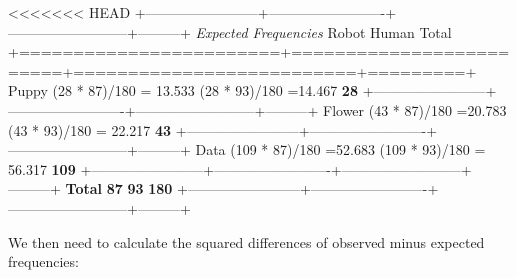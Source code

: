 \documentclass[
]{book}
\begin{document}
\textless\textless\textless\textless\textless\textless\textless{} HEAD
+------------------------+-------------------------+--------------------------+---------+
\textbar{} \emph{Expected Frequencies} \textbar{} Robot \textbar{} Human \textbar{} Total \textbar{}
+========================+=========================+==========================+=========+
\textbar{} Puppy \textbar{} (28 * 87)/180 = 13.533 \textbar{} (28 * 93)/180 =14.467 \textbar{} \textbf{28} \textbar{}
+------------------------+-------------------------+--------------------------+---------+
\textbar{} Flower \textbar{} (43 * 87)/180 =20.783 \textbar{} (43 * 93)/180 = 22.217 \textbar{} \textbf{43} \textbar{}
+------------------------+-------------------------+--------------------------+---------+
\textbar{} Data \textbar{} (109 * 87)/180 =52.683 \textbar{} (109 * 93)/180 = 56.317 \textbar{} \textbf{109} \textbar{}
+------------------------+-------------------------+--------------------------+---------+
\textbar{} \textbf{Total} \textbar{} \textbf{87} \textbar{} \textbf{93} \textbar{} \textbf{180} \textbar{}
+------------------------+-------------------------+--------------------------+---------+

We then need to calculate the squared differences of observed minus expected frequencies:
\end{document}
